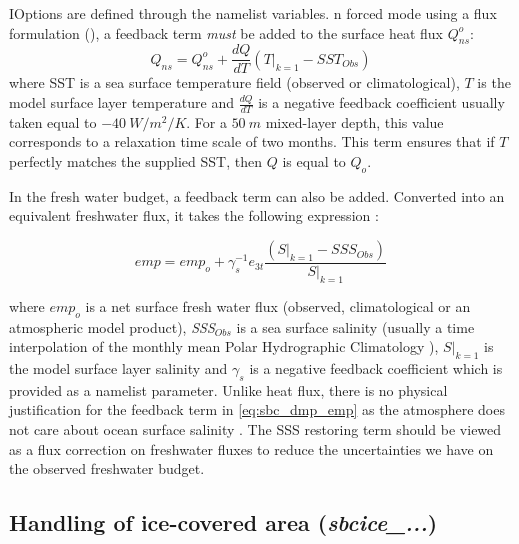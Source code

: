 \documentclass[../tex_main/NEMO_manual]{subfiles}
\begin{document}
IOptions are defined through the   namelist variables.
n forced mode using a flux formulation (), a 
feedback term \emph{must} be added to the surface heat flux $Q_{ns}^o$:
\begin{equation} \label{eq:sbc_dmp_q}
Q_{ns} = Q_{ns}^o + \frac{dQ}{dT} \left( \left. T \right|_{k=1} - SST_{Obs} \right)
\end{equation}
where SST is a sea surface temperature field (observed or climatological), $T$ is 
the model surface layer temperature and $\frac{dQ}{dT}$ is a negative feedback 
coefficient usually taken equal to $-40~W/m^2/K$. For a $50~m$ 
mixed-layer depth, this value corresponds to a relaxation time scale of two months. 
This term ensures that if $T$ perfectly matches the supplied SST, then $Q$ is 
equal to $Q_o$. 

In the fresh water budget, a feedback term can also be added. Converted into an 
equivalent freshwater flux, it takes the following expression :

\begin{equation} \label{eq:sbc_dmp_emp}
\textit{emp} = \textit{emp}_o + \gamma_s^{-1} e_{3t}  \frac{  \left(\left.S\right|_{k=1}-SSS_{Obs}\right)}
												         {\left.S\right|_{k=1}}
\end{equation}

where $\textit{emp}_{o }$ is a net surface fresh water flux (observed, climatological or an
atmospheric model product), \textit{SSS}$_{Obs}$ is a sea surface salinity (usually a time 
interpolation of the monthly mean Polar Hydrographic Climatology \citep{Steele2001}), 
$\left.S\right|_{k=1}$ is the model surface layer salinity and $\gamma_s$ is a negative 
feedback coefficient which is provided as a namelist parameter. Unlike heat flux, there is no 
physical justification for the feedback term in \autoref{eq:sbc_dmp_emp} as the atmosphere 
does not care about ocean surface salinity \citep{Madec1997}. The SSS restoring 
term should be viewed as a flux correction on freshwater fluxes to reduce the 
uncertainties we have on the observed freshwater budget.

\subsection{Handling of ice-covered area  (\textit{sbcice\_...})}
\label{subsec:SBC_ice-cover}
\end{document}
